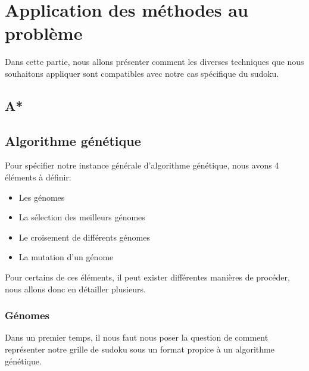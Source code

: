 \chapter{Application des méthodes au problème}
    Dans cette partie, nous allons présenter comment les diverses techniques que nous souhaitons appliquer sont compatibles avec notre cas spécifique du sudoku.
    \section{A*}
    \section{Algorithme génétique}
        Pour spécifier notre instance générale d'algorithme génétique, nous avons 4 éléments à définir:
        \begin{itemize}
            \item Les génomes
            \item La sélection des meilleurs génomes
            \item Le croisement de différents génomes
            \item La mutation d'un génome
        \end{itemize}
        Pour certains de ces éléments, il peut exister différentes manières de procéder, nous allons donc en détailler plusieurs.
        \subsection{Génomes}
            Dans un premier temps, il nous faut nous poser la question de comment représenter notre grille de sudoku sous un format propice à un algorithme génétique.\\
